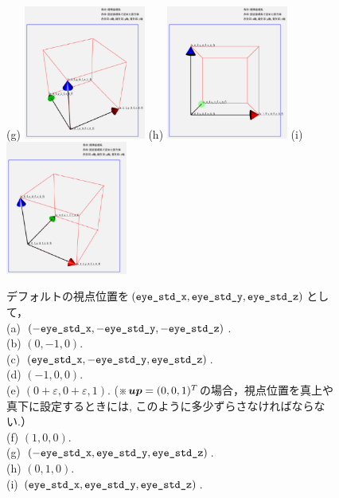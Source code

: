 \documentclass[platex,a4paper,12pt]{jsarticle}%
\def\Vec#1{\mbox{\boldmath $#1$}}
\begin{document}
\begin{figure}[htb]
\vspace{0.5zw}
(g)
\includegraphics[width=40mm]{g_vision_eye_02.eps}
(h)
\includegraphics[width=40mm]{g_vision_eye_01.eps}
(i)
\includegraphics[width=40mm]{g_vision_eye_08.eps}

\begin{flushleft}
デフォルトの視点位置を$(\verb|eye_std_x|, \verb|eye_std_y|, \verb|eye_std_z|)$として，\\
(a) $(-\verb|eye_std_x|, -\verb|eye_std_y|, -\verb|eye_std_z|)$. \\
(b) $(0,-1, 0)$. \\
(c) $(\verb|eye_std_x|, -\verb|eye_std_y|, \verb|eye_std_z|)$. \\
(d) $(-1, 0, 0)$. \\
(e) $(0 + \varepsilon, 0 + \varepsilon, 1)$. 
(※$\Vec{up}=(0,0,1)^T$の場合，視点位置を真上や真下に設定するときには, このように多少ずらさなければならない.）\\
(f) $(1, 0, 0)$. \\
(g) $(-\verb|eye_std_x|, \verb|eye_std_y|, \verb|eye_std_z|)$. \\
(h) $(0, 1, 0)$. \\
(i) $(\verb|eye_std_x|, \verb|eye_std_y|, \verb|eye_std_z|)$.
\end{flushleft}
\end{figure}
\end{document}
